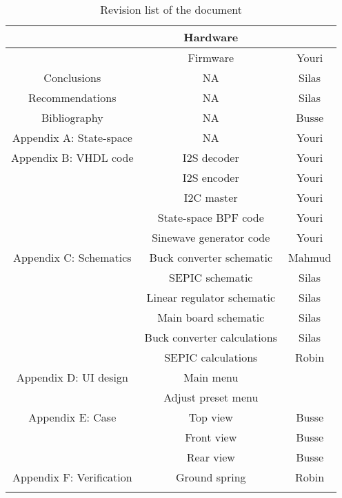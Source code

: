 \begin{justify}
\begin{table}[!h]
\begin{tabular}{|c|c|c|}
							& Hardware						& 					\\ \hline
							& Firmware						& Youri				\\ \hline
Conclusions					& NA							& Silas				\\ \hline
Recommendations				& NA							& Silas				\\ \hline
Bibliography				& NA							& Busse				\\ \hline
Appendix A: State-space		& NA							& Youri				\\ \hline
Appendix B: VHDL code		& I2S decoder					& Youri				\\ \hline
							& I2S encoder					& Youri				\\ \hline
							& I2C master					& Youri				\\ \hline
							& State-space BPF code			& Youri				\\ \hline
							& Sinewave generator code		& Youri				\\ \hline
Appendix C: Schematics		& Buck converter schematic		& Mahmud			\\ \hline
							& SEPIC schematic				& Silas				\\ \hline
							& Linear regulator schematic	& Silas				\\ \hline
							& Main board schematic			& Silas				\\ \hline
							& Buck converter calculations	& Silas				\\ \hline
							& SEPIC calculations			& Robin				\\ \hline
Appendix D: UI design		& Main menu						& 					\\ \hline
							& Adjust preset menu			& 					\\ \hline
Appendix E: Case			& Top view						& Busse				\\ \hline
							& Front view					& Busse				\\ \hline
							& Rear view						& Busse				\\ \hline
Appendix F: Verification	& Ground spring					& Robin				\\ \hline

	\caption{Revision list of the document}
	\label{table:revision_history}
\end{longtable}

\newpage
\pagestyle{plain}
\setcounter{page}{1}

\chapter*{Abbreviation List}


\end{tabular}
\end{table}
\end{justify}
